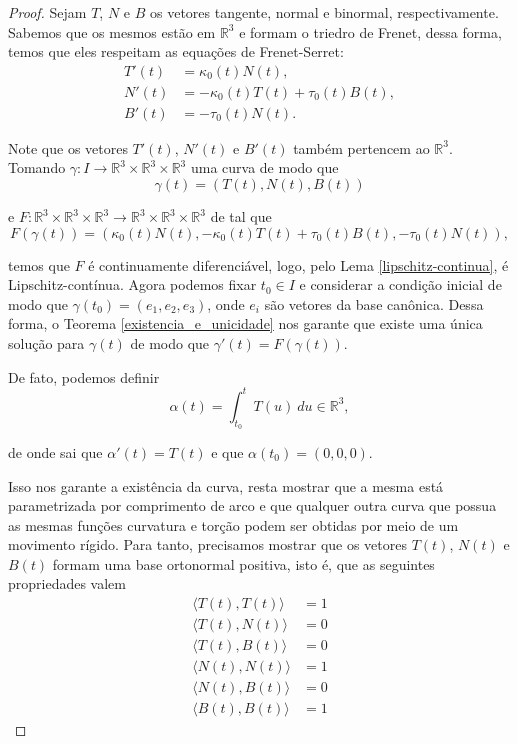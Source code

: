 \documentclass[11pt,letterpaper,twocolumn]{article}
\begin{document}
\begin{proof}
    Sejam $T$, $N$ e $B$ os vetores tangente, normal e binormal, respectivamente. Sabemos que os mesmos estão em $\mathbb{R}^3$ e formam o triedro de Frenet, dessa forma, temos que eles respeitam as equações de Frenet-Serret:
    \begin{equation}
        \begin{split}
            T'(t) & = \kappa_0(t) N(t), \\
            N'(t) & = -\kappa_0(t) T(t) + \tau_0(t) B(t), \\
            B'(t) & = -\tau_0(t) N(t).
        \end{split}
        \label{frenet}
    \end{equation}
    
    Note que os vetores $T'(t)$, $N'(t)$ e $B'(t)$ também pertencem ao $\mathbb{R}^3$. Tomando $\gamma : I\to \mathbb{R}^3\times \mathbb{R}^3\times \mathbb{R}^3$ uma curva de modo que
    \[\gamma(t) = \left(T(t), N(t), B(t)\right)\]
    
    \noindent e $F : \mathbb{R}^3\times \mathbb{R}^3\times \mathbb{R}^3\to \mathbb{R}^3\times \mathbb{R}^3\times \mathbb{R}^3$ de tal que
    \[F(\gamma(t)) = \left(\kappa_0(t) N(t), -\kappa_0(t) T(t) + \tau_0(t) B(t), -\tau_0(t) N(t)\right),\]
    
    \noindent temos que $F$ é continuamente diferenciável, logo, pelo Lema \ref{lipschitz-continua}, é Lipschitz-contínua. Agora podemos fixar $t_0\in I$ e considerar a condição inicial de modo que $\gamma(t_0) = \left(e_1, e_2, e_3\right)$, onde $e_i$ são vetores da base canônica. Dessa forma, o Teorema \ref{existencia_e_unicidade} nos garante que existe uma única solução para $\gamma(t)$ de modo que $\gamma'(t) = F(\gamma(t))$.
    
    De fato, podemos definir
    \[\alpha(t) = \int_{t_0}^{t} T(u) ~du \in \mathbb{R}^3,\]
    
    \noindent de onde sai que $\alpha'(t) = T(t)$ e que $\alpha(t_0) = (0, 0, 0)$. 
    
    Isso nos garante a existência da curva, resta mostrar que a mesma está parametrizada por comprimento de arco e que qualquer outra curva que possua as mesmas funções curvatura e torção podem ser obtidas por meio de um movimento rígido. Para tanto, precisamos mostrar que os vetores $T(t)$, $N(t)$ e $B(t)$ formam uma base ortonormal positiva, isto é, que as seguintes propriedades valem
    \begin{equation}
        \begin{split}
            \langle T(t), T(t)\rangle & = 1 \\
            \langle T(t), N(t)\rangle & = 0 \\
            \langle T(t), B(t)\rangle & = 0 \\
            \langle N(t), N(t)\rangle & = 1 \\
            \langle N(t), B(t)\rangle & = 0 \\
            \langle B(t), B(t)\rangle & = 1
        \end{split}
        \label{condicoes_escalares}
    \end{equation}
    

\end{proof}
\end{document}
